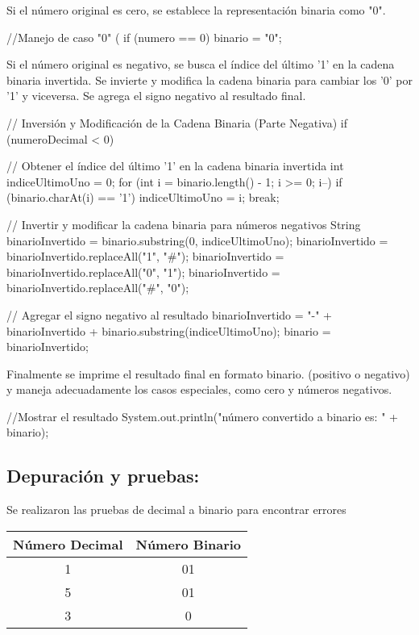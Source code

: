 Si el número original es cero, se establece la representación binaria como "0".

\begin{javaCode}
   //Manejo de caso "0"
   ( 
        if (numero == 0) {
    binario = "0";
}
\end{javaCode}

Si el número original es negativo, se busca el índice del último '1' en la cadena binaria invertida.
Se invierte y modifica la cadena binaria para cambiar los '0' por '1' y viceversa.
Se agrega el signo negativo al resultado final.

\begin{javaCode}
// Inversión y Modificación de la Cadena Binaria (Parte Negativa)
   if (numeroDecimal < 0) {
    // Obtener el índice del último '1' en la cadena binaria invertida
    int indiceUltimoUno = 0;
    for (int i = binario.length() - 1; i >= 0; i--) {
        if (binario.charAt(i) == '1') {
            indiceUltimoUno = i;
            break;
        }
    }

    // Invertir y modificar la cadena binaria para números negativos
    String binarioInvertido = binario.substring(0, indiceUltimoUno);
    binarioInvertido = binarioInvertido.replaceAll("1", "#");
    binarioInvertido = binarioInvertido.replaceAll("0", "1");
    binarioInvertido = binarioInvertido.replaceAll("#", "0");

    // Agregar el signo negativo al resultado
    binarioInvertido = "-" + binarioInvertido + binario.substring(indiceUltimoUno);
    binario = binarioInvertido;
}
\end{javaCode}
Finalmente se imprime el resultado final en formato binario.
(positivo o negativo) y maneja adecuadamente los casos especiales, como cero y números negativos.

\begin{javaCode}
   //Mostrar el resultado
   System.out.println("\nEl número convertido a binario es: " + binario);
\end{javaCode}


\subsection{\textbf{Depuración y pruebas:}}
Se realizaron las pruebas de decimal a binario para encontrar errores
\begin{tabular}{|c|c|}
\hline
\textbf{Número Decimal} & \textbf{Número Binario} \\
\hline
1 & 01 \\
\hline
5 & 01 \\
\hline
3 & 0 \\
\hline
\end{tabular}
\\
\\